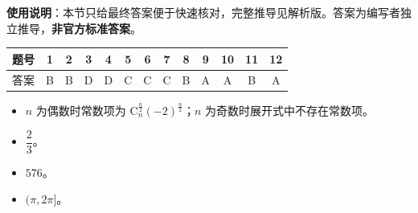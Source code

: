 
\begin{gknotice}
\textbf{使用说明}：本节只给最终答案便于快速核对，完整推导见解析版。答案为编写者独立推导，\textbf{非官方标准答案}。
\end{gknotice}

\begin{center}\begin{tabular}{ccccccccccccc}
\toprule
题号 & 1 & 2 & 3 & 4 & 5 & 6 & 7 & 8 & 9 & 10 & 11 & 12 \\
\midrule
答案 & B & B & D & D & C & C & C & B & A & A & B & A \\
\bottomrule
\end{tabular}\end{center}

\begin{itemize}[leftmargin=2.6em]
  \item[\textbf{13.}] $n$ 为偶数时常数项为 $\mathrm{C}_{n}^{\frac{n}{2}}(-2)^{\frac{n}{2}}$；$n$ 为奇数时展开式中不存在常数项。
  \item[\textbf{14.}] $\dfrac{2}{3}$。
  \item[\textbf{15.}] $576$。
  \item[\textbf{16.}] $(\pi, 2\pi]$。
\end{itemize}

